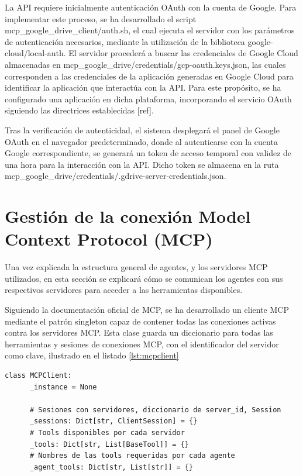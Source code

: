 \begin{itemize}
La API requiere inicialmente autenticación OAuth con la cuenta de Google. Para implementar este proceso, se ha desarrollado el script mcp\_google\_drive\_client/auth.sh, el cual ejecuta el servidor con los parámetros de autenticación necesarios, mediante la utilización de la biblioteca google-cloud/local-auth. El servidor procederá a buscar las credenciales de Google Cloud almacenadas en mcp\_google\_drive/credentials/gcp-oauth.keys.json, las cuales corresponden a las credenciales de la aplicación generadas en Google Cloud para identificar la aplicación que interactúa con la API. Para este propósito, se ha configurado una aplicación en dicha plataforma, incorporando el servicio OAuth siguiendo las directrices establecidas [ref].

Tras la verificación de autenticidad, el sistema desplegará el panel de Google OAuth en el navegador predeterminado, donde al autenticarse con la cuenta Google correspondiente, se generará un token de acceso temporal con validez de una hora para la interacción con la API. Dicho token se almacena en la ruta mcp\_google\_drive/credentials/.gdrive-server-credentials.json.

\end{itemize}

\section{Gestión de la conexión Model Context Protocol (MCP)}
Una vez explicada la estructura general de agentes, y los servidores MCP utilizados, en esta sección se explicará cómo se comunican los agentes con sus respectivos servidores para acceder a las herramientas disponibles.

Siguiendo la documentación oficial de MCP, se ha desarrollado un cliente MCP mediante el patrón singleton capaz de contener todas las conexiones activas contra los servidores MCP. Esta clase guarda un diccionario para todas las herramientas y sesiones de conexiones MCP, con el identificador del servidor como clave, ilustrado en el listado \ref{lst:mcpclient}

\begin{lstlisting}[caption={Clase singleton MCPClient},label={lst:mcpclient}]
  class MCPClient:
      _instance = None

      # Sesiones con servidores, diccionario de server_id, Session
      _sessions: Dict[str, ClientSession] = {}
      # Tools disponibles por cada servidor
      _tools: Dict[str, List[BaseTool]] = {}
      # Nombres de las tools requeridas por cada agente
      _agent_tools: Dict[str, List[str]] = {}
\end{lstlisting}

